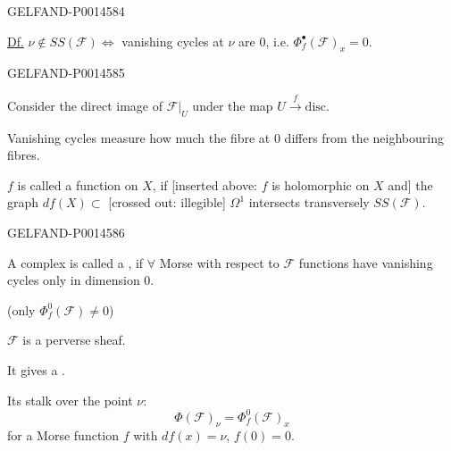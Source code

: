 \begin{GelfandAdjacentEvidence}{GELFAND-P001458}{4}


\uline{Df.} \(\nu\notin SS(\mathcal F)\Longleftrightarrow\)
vanishing cycles at \(\nu\) are \(0\), i.e. \(\Phi_f^\bullet(\mathcal F)_x=0\).
\end{GelfandAdjacentEvidence}
\begin{GelfandAdjacentEvidence}{GELFAND-P001458}{5}


Consider the direct image of \(\mathcal F|_U\) under the map \(U\overset{f}{\longrightarrow}\text{disc}\).

Vanishing cycles measure how much the fibre at 0 differs from the neighbouring fibres.

\(f\) is called a  function on \(X\), if
[inserted above: \(f\) is holomorphic on \(X\) and] the graph \(df(X)\subset\) [crossed out: illegible] \(\Omega^1\)
intersects transversely \(SS(\mathcal F)\).
\end{GelfandAdjacentEvidence}
\begin{GelfandAdjacentEvidence}{GELFAND-P001458}{6}


A complex is called a , if \(\forall\) Morse with respect to \(\mathcal F\) functions have vanishing cycles only in dimension 0.

(only \(\Phi_f^0(\mathcal F)\ne0\))

\(\mathcal F\) is a perverse sheaf.

It gives a .

Its stalk over the point \(\nu\):
\[
\Phi(\mathcal F)_\nu=\Phi_f^0(\mathcal F)_x
\]
for a Morse function \(f\) with \(df(x)=\nu\), \(f(0)=0\).
\end{GelfandAdjacentEvidence}
